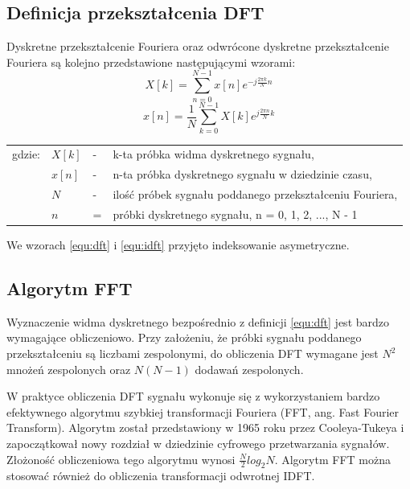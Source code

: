\subsection{Definicja przekształcenia DFT}
Dyskretne przekształcenie Fouriera oraz odwrócone dyskretne przekształcenie Fouriera są kolejno przedstawione następującymi wzorami:
\begin{equation} \label{equ:dft}
X[k] = \sum_{n=0}^{N-1} x[n]e^{-j\frac{2\pi k}{N}n}
\end{equation}
\begin{equation} \label{equ:idft}
x[n] = \frac{1}{N}\sum_{k=0}^{N-1} X[k]e^{j\frac{2\pi n}{N}k}
\end{equation}
\begin{tabular}{ l l l l}
	gdzie: & $X[k]$ &  - & k-ta próbka widma dyskretnego sygnału, \\
	&	$x[n]$ & - &  n-ta próbka dyskretnego sygnału w dziedzinie czasu, \\
	&	$N$ & - &  ilość próbek sygnału poddanego przekształceniu Fouriera,\\
	&	$n$ & = &  próbki dyskretnego sygnału, n = 0, 1, 2, ..., N - 1 \\
\end{tabular}

We wzorach \ref{equ:dft} i \ref{equ:idft} przyjęto indeksowanie asymetryczne.

\subsection{Algorytm FFT}
Wyznaczenie widma dyskretnego bezpośrednio z definicji \ref{equ:dft} jest bardzo wymagające obliczeniowo. Przy założeniu, że próbki sygnału poddanego przekształceniu są liczbami zespolonymi, do obliczenia DFT wymagane jest $N^{2}$ mnożeń zespolonych oraz $N(N-1)$ dodawań zespolonych.

W praktyce obliczenia DFT sygnału wykonuje się z wykorzystaniem bardzo efektywnego algorytmu szybkiej transformacji Fouriera (FFT, ang. Fast Fourier Transform). Algorytm został przedstawiony w 1965 roku przez Cooleya-Tukeya i zapoczątkował nowy rozdział w dziedzinie cyfrowego przetwarzania sygnałów. Złożoność obliczeniowa tego algorytmu wynosi $\frac{N}{2}log_{2}N$. Algorytm FFT można stosować również do obliczenia transformacji odwrotnej IDFT.

